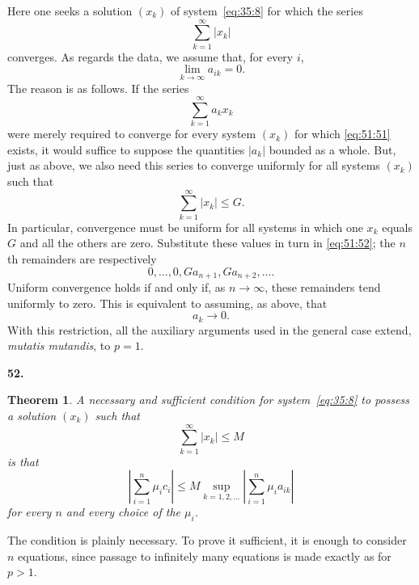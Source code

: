 \documentclass[
  paper=b5,
  fontsize=13pt,
  twoside=true,
  open=any,
  bookmarkpackage=false,
  chapterprefix=true,
  headings=normal
]{scrbook}
\newtheorem*{theorem}{Theorem}
\theoremstyle{definition}
\newcommand{\numberedparagraph}[1]{%
  \par\medskip\phantomsection\label{sec:#1}%
  \noindent\textbf{#1.}\enspace
}
\begin{document}
Here one seeks a solution $(x_k)$ of system~\eqref{eq:35:8} for which the series
\begin{equation}
  \sum_{k=1}^{\infty}|x_k|
  \tag{51}\label{eq:51:51}
\end{equation}
converges. As regards the data, we assume that, for every $i$,
\[
  \lim_{k\to\infty}a_{ik}=0.
\]
The reason is as follows. If the series
\begin{equation}
  \sum_{k=1}^{\infty}a_kx_k
  \tag{52}\label{eq:51:52}
\end{equation}
were merely required to converge for every system $(x_k)$ for which
\eqref{eq:51:51} exists, it would suffice to suppose the quantities
$|a_k|$ bounded as a whole. But, just as above, we also need this series to
converge uniformly for all systems $(x_k)$ such that
\[
  \sum_{k=1}^{\infty}|x_k|\leq G.
\]
In particular, convergence must be uniform for all systems in which one
$x_k$ equals $G$ and all the others are zero. Substitute these values in
turn in \eqref{eq:51:52}; the $n$th remainders are respectively
\[
  0,\ldots,0,Ga_{n+1},Ga_{n+2},\ldots.
\]
Uniform convergence holds if and only if, as $n\to\infty$, these remainders
tend uniformly to zero. This is equivalent to assuming, as above, that
\[
  a_k\to0.
\]
With this restriction, all the auxiliary arguments used in the general
case extend, \emph{mutatis mutandis}, to $p=1$.

\numberedparagraph{52}
\begin{theorem}
A necessary and sufficient condition for system~\eqref{eq:35:8} to possess a solution
$(x_k)$ such that
\begin{equation}
  \sum_{k=1}^{\infty}|x_k|\leq M
  \tag{53}\label{eq:52:53}
\end{equation}
is that
\begin{equation}
  \left|\sum_{i=1}^{n}\mu_i c_i\right|
  \leq M\operatorname*{sup}_{k=1,2,\ldots}
    \left|\sum_{i=1}^{n}\mu_i a_{ik}\right|
  \tag{54}\label{eq:52:54}
\end{equation}
for every $n$ and every choice of the $\mu_i$.
\end{theorem}

The condition is plainly necessary. To prove it sufficient, it is enough
to consider $n$ equations, since passage to infinitely many equations is
made exactly as for $p>1$.
\end{document}
